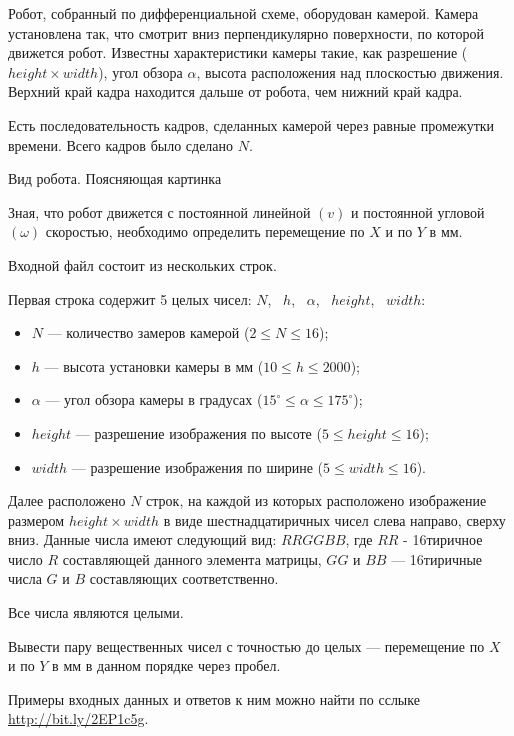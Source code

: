

Робот, собранный по дифференциальной схеме, оборудован камерой.
Камера установлена так, что смотрит вниз перпендикулярно поверхности, по которой движется робот.
Известны характеристики камеры такие, как разрешение ($height\times width$),
угол обзора $\alpha$, высота расположения над плоскостью движения.
Верхний край кадра находится дальше от робота, чем нижний край кадра.

Есть последовательность кадров, сделанных камерой через равные промежутки времени.
Всего кадров было сделано $N$.

{Вид робота. Поясняющая картинка}


Зная, что робот движется с постоянной линейной $(v)$ и постоянной угловой $(\omega)$ скоростью,
необходимо определить перемещение по $X$ и по $Y$ в мм.


Входной файл состоит из нескольких строк.

Первая строка содержит 5 целых чисел: $N$,~ $h$,~ $\alpha$,~ $height$,~ $width$:
\begin{itemize}
    \item $N$ --- количество замеров камерой ($2 \leq N \leq 16$);
    \item $h$ --- высота установки камеры в мм ($10 \leq h \leq 2000$);
    \item $\alpha$ --- угол обзора камеры в градусах ($15^\circ \leq \alpha \leq 175^\circ$);
    \item $height$ --- разрешение изображения по высоте ($5 \leq height \leq 16$);
    \item $width$ --- разрешение изображения по ширине ($5 \leq width \leq 16$).
\end{itemize}

Далее расположено $N$ строк, на каждой из которых расположено изображение размером
$height\times width$ в виде шестнадцатиричных чисел слева направо, сверху вниз.
Данные числа имеют следующий вид: $RRGGBB$, где $RR$ - 16тиричное число $R$ составляющей данного элемента
матрицы, $GG$ и $BB$ --- 16тиричные числа $G$ и $B$ составляющих соответственно.

Все числа являются целыми.


\outputfmtSection

Вывести пару вещественных чисел с точностью до целых --- перемещение по $X$ и по $Y$  в мм в данном порядке через пробел.


\exampleSection

Примеры входных данных и ответов к ним можно найти по сслыке \url{http://bit.ly/2EP1c5g}.





